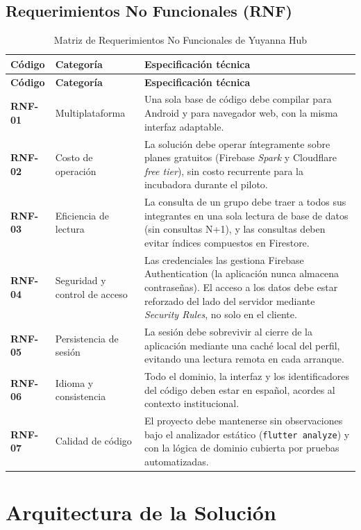 \documentclass[12pt,a4paper]{article}
\begin{document}
\subsection{Requerimientos No Funcionales (RNF)}

\begin{longtable}{L{1.7cm}L{3.6cm}L{8.3cm}}
\caption{Matriz de Requerimientos No Funcionales de Yuyanna Hub}\label{tab:rnf}\\
\toprule
\textbf{Código} & \textbf{Categoría} & \textbf{Especificación técnica} \\
\midrule
\endfirsthead
\toprule
\textbf{Código} & \textbf{Categoría} & \textbf{Especificación técnica} \\
\midrule
\endhead
\bottomrule
\endfoot
\textbf{RNF-01} & Multiplataforma & Una sola base de código debe compilar para Android y para navegador web, con la misma interfaz adaptable. \\
\textbf{RNF-02} & Costo de operación & La solución debe operar íntegramente sobre planes gratuitos (Firebase \emph{Spark} y Cloudflare \emph{free tier}), sin costo recurrente para la incubadora durante el piloto. \\
\textbf{RNF-03} & Eficiencia de lectura & La consulta de un grupo debe traer a todos sus integrantes en una sola lectura de base de datos (sin consultas N+1), y las consultas deben evitar índices compuestos en Firestore. \\
\textbf{RNF-04} & Seguridad y control de acceso & Las credenciales las gestiona Firebase Authentication (la aplicación nunca almacena contraseñas). El acceso a los datos debe estar reforzado del lado del servidor mediante \emph{Security Rules}, no solo en el cliente. \\
\textbf{RNF-05} & Persistencia de sesión & La sesión debe sobrevivir al cierre de la aplicación mediante una caché local del perfil, evitando una lectura remota en cada arranque. \\
\textbf{RNF-06} & Idioma y consistencia & Todo el dominio, la interfaz y los identificadores del código deben estar en español, acordes al contexto institucional. \\
\textbf{RNF-07} & Calidad de código & El proyecto debe mantenerse sin observaciones bajo el analizador estático (\texttt{flutter analyze}) y con la lógica de dominio cubierta por pruebas automatizadas. \\
\end{longtable}

\newpage
\section{Arquitectura de la Solución}
\end{document}
